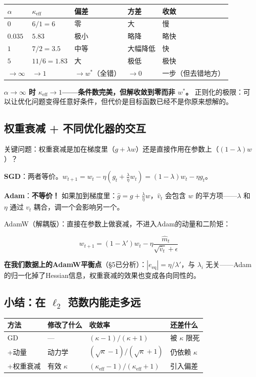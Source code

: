 \documentclass[12pt,a4paper]{article}
\begin{document}
\begin{center}\small
\begin{longtable}{|l|l|l|l|l|}
\hline
$\alpha$ & $\kappa_{\text{eff}}$ & 偏差 & 方差 & 收敛 \\
\hline
$0$ & $6/1 = 6$ & 零 & 大 & 慢 \\
$0.035$ & $5.83$ & 极小 & 略降 & 略快 \\
$1$ & $7/2 = 3.5$ & 中等 & 大幅降低 & 快 \\
$5$ & $11/6 = 1.83$ & 大 & 极低 & 极快 \\
$\to\infty$ & $\to 1$ & $\to w^*$（全错） & $\to 0$ & 一步（但去错地方） \\
\hline
\end{longtable}
\end{center}

\textbf{$\alpha \to \infty$ 时 $\kappa_{\text{eff}} \to 1$——条件数完美，但解收敛到零而非 $w^*$。} 正则化的极限：可以让优化问题变得任意好条件，但代价是目标函数已经不是你原来想解的。


\subsection{权重衰减 + 不同优化器的交互}

关键问题：权重衰减是加在梯度里（$g + \lambda w$）还是直接作用在参数上（$(1-\lambda)w$）？

\textbf{SGD}：两者等价。$w_{t+1} = w_t - \eta(g_t + \frac{\lambda}{\eta}w_t) = (1-\lambda)w_t - \eta g_t$。

\textbf{Adam}：\textbf{不等价！} 如果加到梯度里：$\hat{g} = g + \frac{\lambda}{\eta}w$，$\hat{v}_t$ 会包含 $w$ 的平方项——$\lambda$ 和 $\eta$ 通过 $v_t$ 耦合，调一个会影响另一个。

AdamW（解耦版）：直接在参数上做衰减，不进入Adam的动量和二阶矩：


\[w_{t+1} = (1-\lambda')w_t - \eta\frac{\hat{m}_t}{\sqrt{\hat{v}_t}+\epsilon}\]

\textbf{在我们数据上的AdamW平衡点}（§5已分析）：$|e_{\text{eq}}| = \eta/\lambda'$，与 $\lambda_i$ 无关——Adam的归一化掉了Hessian信息，权重衰减的效果也变成各向同性的。


\subsection{小结：在 $\ell_2$ 范数内能走多远}






\begin{center}\small
\begin{longtable}{|l|l|l|l|}
\hline
方法 & 修改了什么 & 收敛率 & 还差什么 \\
\hline
GD & — & $(\kappa-1)/(\kappa+1)$ & 被 $\kappa$ 限死 \\
+动量 & 动力学 & $(\sqrt\kappa-1)/(\sqrt\kappa+1)$ & 仍依赖 $\kappa$ \\
+权重衰减 & 有效 $\kappa$ & $(\kappa_{\text{eff}}-1)/(\kappa_{\text{eff}}+1)$ & 引入偏差 \\
\hline
\end{longtable}
\end{center}
\end{document}
